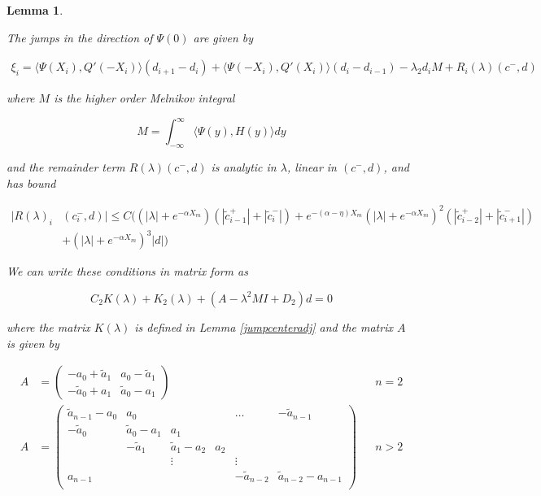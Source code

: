 \documentclass[12pt]{article}
\newtheorem{lemma}{Lemma}
\begin{document}
\begin{lemma}\label{jumpadj}

The jumps in the direction of $\Psi(0)$ are given by

\begin{align}\label{xi}
\xi_i = \langle \Psi(X_i), Q'(-X_i) \rangle (d_{i+1} - d_i)
+ \langle \Psi(-X_i), Q'(X_i) \rangle (d_i - d_{i-1})
- \lambda_2 d_i M + R_i(\lambda)(c^-, d)
\end{align}

where $M$ is the higher order Melnikov integral

\begin{equation}\label{M}
M = \int_{-\infty}^\infty \langle \Psi(y), H(y) \rangle dy 
\end{equation}

and the remainder term $R(\lambda)(c^-, d)$ is analytic in $\lambda$, linear in $(c^-, d)$, and has bound

\begin{align}\label{R}
|R(\lambda)_i&(c_i^-, d)| \leq C \Big( (|\lambda| + e^{-\alpha X_m})(|\tilde{c}_{i-1}^+| + |\tilde{c}_{i}^-|) + e^{-(\alpha - \eta) X_m}(|\lambda| + e^{-\alpha X_m})^2(|\tilde{c}_{i-2}^+| + |\tilde{c}_{i+1}^-|) \\
&+ (|\lambda| + e^{-\alpha X_m})^3 |d| \Big) \nonumber
\end{align}

We can write these conditions in matrix form as

\begin{equation}
C_2 K(\lambda) + K_2(\lambda) + (A - \lambda^2 M I + D_2)d = 0
\end{equation}

where the matrix $K(\lambda)$ is defined in Lemma \ref{jumpcenteradj} and the matrix $A$ is given by

\begin{align*}
A &= \begin{pmatrix}
-a_0 + \tilde{a}_1 & a_0 - \tilde{a}_1 \\
-\tilde{a}_0 + a_1 & \tilde{a}_0 - a_1
\end{pmatrix} && n = 2 \\
A &= \begin{pmatrix}
\tilde{a}_{n-1} - a_0 & a_0 & & & \dots & -\tilde{a}_{n-1}\\
-\tilde{a}_0 & \tilde{a}_0 - a_1 &  a_1 \\
& -\tilde{a}_1 & \tilde{a}_1 - a_2 &  a_2 \\
& & \vdots & & \vdots \\
a_{n-1} & & & & -\tilde{a}_{n-2} & \tilde{a}_{n-2} - a_{n-1} \\
\end{pmatrix} && n > 2
\end{align*}


\end{lemma}
\end{document}

